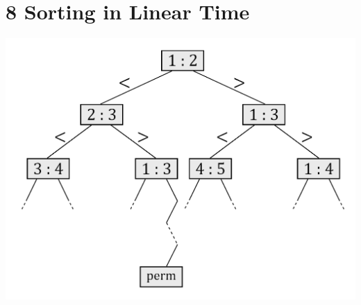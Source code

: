 \documentclass{report}
\begin{document}
\section*{8 Sorting in Linear Time}
\begin{center}
    \includegraphics[width = 10 cm]{../entities/decision_tree_lower_bound_comparison_sort.png}
\end{center}
\end{document}
